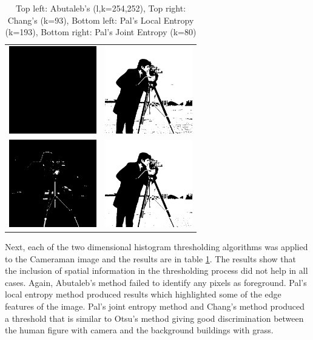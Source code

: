 \documentclass[journal]{IEEEtran}
\begin{document}
\begin{table}[!h]
\centering
\begin{tabular}{cc}
\includegraphics[width=1.5in]{../results/cameraman_abutaleb.png} &
\includegraphics[width=1.5in]{../results/cameraman_chang.png} \\
\newline
\includegraphics[width=1.5in]{../results/cameraman_le_pal.png} &
\includegraphics[width=1.5in]{../results/cameraman_je_pal.png} \\
\end{tabular}
\caption{Top left: Abutaleb's (l,k=254,252), Top right: Chang's (k=93), Bottom left: Pal's Local Entropy (k=193), Bottom right: Pal's Joint Entropy (k=80)}
\label{tab:cameramanTable2}
\end{table}

\par Next, each of the two dimensional histogram thresholding algorithms was applied to the Cameraman image and the results are in table \ref{tab:cameramanTable2}. The results show that the inclusion of spatial information in the thresholding process did not help in all cases. Again, Abutaleb's method failed to identify any pixels as foreground. Pal's local entropy method produced results which highlighted some of the edge features of the image. Pal's joint entropy method and Chang's method produced a threshold that is similar to Otsu's method giving good discrimination between the human figure with camera and the background buildings with grass.
\end{document}
